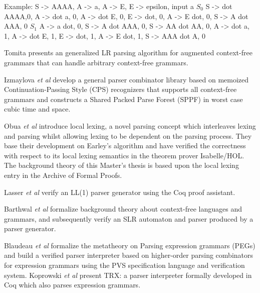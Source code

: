 \begin{isabellebody}
\begin{isamarkuptext}
Example:
S -> AAAA, A -> a, A -> E, E -> epsilon, input a
$S_0$ S -> dot AAAA,0, A -> dot a, 0, A -> dot E, 0, E -> dot, 0, A -> E dot, 0, S -> A dot AAA, 0
$S_1$ A -> a dot, 0, S -> A dot AAA, 0, S -> AA dot AA, 0, A -> dot a, 1, A -> dot E, 1, E -> dot, 1, A -> E dot, 1, S -> AAA dot A, 0%
\end{isamarkuptext}\isamarkuptrue%
%
\isadelimdocument
%
\endisadelimdocument
%
\isatagdocument
%
\isamarkuptrue%
%
\isamarkuptrue%
%
\endisatagdocument
{\isafolddocument}%
%
\isadelimdocument
%
\endisadelimdocument
%
\begin{isamarkuptext}%
Tomita \cite{Tomita:1987} presents an generalized LR parsing algorithm for augmented
context-free grammars that can handle arbitrary context-free grammars.

Izmaylova \textit{et al} \cite{Izmaylova:2016} develop a general parser 
combinator library based on memoized Continuation-Passing Style (CPS) recognizers that supports all
context-free grammars and constructs a Shared Packed Parse Forest (SPPF) in worst case cubic time and space.%
\end{isamarkuptext}\isamarkuptrue%
%
\isadelimdocument
%
\endisadelimdocument
%
\isatagdocument
%
\isamarkuptrue%
%
\endisatagdocument
{\isafolddocument}%
%
\isadelimdocument
%
\endisadelimdocument
%
\begin{isamarkuptext}%
Obua \textit{et al} \cite{Obua:2017} introduce local lexing, a novel parsing concept which interleaves
lexing and parsing whilst allowing lexing to be dependent on the parsing process. They base their
development on Earley's algorithm and have verified the correctness with respect to its local lexing
semantics in the theorem prover Isabelle/HOL. The background theory of this Master's thesis is based
upon the local lexing entry \cite{LocalLexing-AFP} in the Archive of Formal Proofs.

Lasser \textit{et al} \cite{Lasser:2019} verify an LL(1) parser generator using the Coq proof assistant.

Barthwal \textit{et al} \cite{Barthwal:2009} formalize background theory
about context-free languages and grammars, and subsequently verify an SLR automaton and parser produced
by a parser generator.

Blaudeau \textit{et al} \cite{Blaudeau:2020} formalize the metatheory on Parsing expression grammars (PEGs) and
build a verified parser interpreter based on higher-order parsing combinators for expression grammars
using the PVS specification language and verification system. Koprowski \textit{et al} \cite{Koprowski:2011}
present TRX: a parser interpreter formally developed in Coq which also parses expression grammars.


\end{isamarkuptext}
\end{isabellebody}
